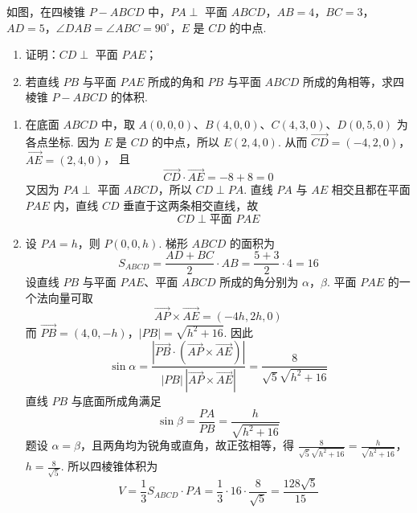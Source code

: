 \begin{problem}
如图，在四棱锥 \(P-ABCD\) 中，\(PA\perp\) 平面 \(ABCD\)，\(AB=4\)，\(BC=3\)，\(AD=5\)，\(\angle DAB=\angle ABC=90^\circ\)，\(E\) 是 \(CD\) 的中点.

\begin{enumerate}
\item 证明：\(CD\perp\) 平面 \(PAE\)；
\item 若直线 \(PB\) 与平面 \(PAE\) 所成的角和 \(PB\) 与平面 \(ABCD\) 所成的角相等，求四棱锥 \(P-ABCD\) 的体积.
\end{enumerate}


\begin{solution}
\begin{enumerate}
\item 在底面 \(ABCD\) 中，取 \(A(0,0,0)\)、\(B(4,0,0)\)、\(C(4,3,0)\)、\(D(0,5,0)\) 为各点坐标.
因为 \(E\) 是 \(CD\) 的中点，所以 \(E(2,4,0)\). 从而
\(\overrightarrow{CD}=(-4,2,0)\)，\(\overrightarrow{AE}=(2,4,0)\)，
且
\[
\overrightarrow{CD}\cdot\overrightarrow{AE}=-8+8=0
\]
又因为 \(PA\perp\) 平面 \(ABCD\)，所以 \(CD\perp PA\). 直线 \(PA\) 与 \(AE\) 相交且都在平面 \(PAE\) 内，直线 \(CD\) 垂直于这两条相交直线，故
\[
CD\perp\text{平面 }PAE
\]

\item 设 \(PA=h\)，则 \(P(0,0,h)\). 梯形 \(ABCD\) 的面积为
\[
S_{ABCD}=\frac{AD+BC}{2}\cdot AB
=\frac{5+3}{2}\cdot4=16
\]
设直线 \(PB\) 与平面 \(PAE\)、平面 \(ABCD\) 所成的角分别为 \(\alpha\)，\(\beta\). 平面 \(PAE\) 的一个法向量可取
\[
\overrightarrow{AP}\times\overrightarrow{AE}
=(-4h,2h,0)
\]
而
\(\overrightarrow{PB}=(4,0,-h)\)，\(|PB|=\sqrt{h^2+16}\).
因此
\[
\sin\alpha
=\frac{|\overrightarrow{PB}\cdot(\overrightarrow{AP}\times\overrightarrow{AE})|}
{|PB|\,|\overrightarrow{AP}\times\overrightarrow{AE}|}
=\frac{8}{\sqrt5\sqrt{h^2+16}}
\]
直线 \(PB\) 与底面所成角满足
\[
\sin\beta=\frac{PA}{PB}=\frac{h}{\sqrt{h^2+16}}
\]
题设 \(\alpha=\beta\)，且两角均为锐角或直角，故正弦相等，得
\(\frac{8}{\sqrt5\sqrt{h^2+16}} =\frac{h}{\sqrt{h^2+16}}\)，\(h=\frac8{\sqrt5}\).
所以四棱锥体积为
\[
V=\frac13S_{ABCD}\cdot PA
=\frac13\cdot16\cdot\frac8{\sqrt5}
=\frac{128\sqrt5}{15}
\]
\end{enumerate}
\end{solution}
\end{problem}

